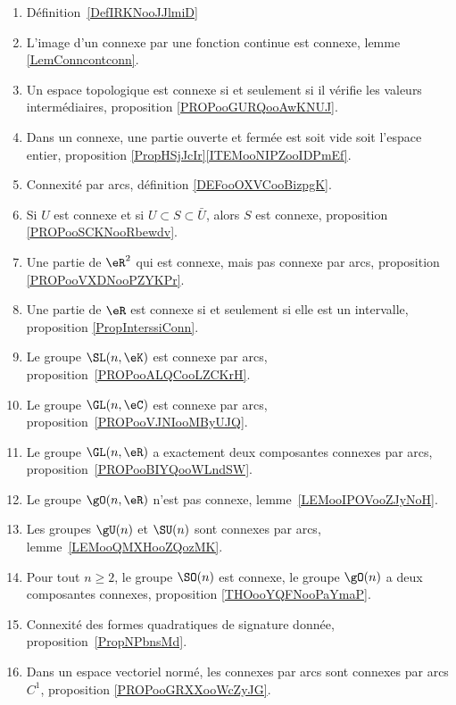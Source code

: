 	\label{THEMEooConnexite}
\begin{enumerate}
	\item
	      Définition~\ref{DefIRKNooJJlmiD}
	\item
	      L'image d'un connexe par une fonction continue est connexe, lemme \ref{LemConncontconn}.
	\item
	      Un espace topologique est connexe si et seulement si il vérifie les valeurs intermédiaires, proposition \ref{PROPooGURQooAwKNUJ}.
	\item
	      Dans un connexe, une partie ouverte et fermée est soit vide soit l'espace entier, proposition \ref{PropHSjJcIr}\ref{ITEMooNIPZooIDPmEf}.
	\item
	      Connexité par arcs, définition \ref{DEFooOXVCooBizpgK}.
	\item
	      Si \( U\) est connexe et si \( U\subset S\subset \bar U\), alors \( S\) est connexe, proposition \ref{PROPooSCKNooRbewdv}.
	\item
	      Une partie de \( \eR^2\) qui est connexe, mais pas connexe par arcs, proposition \ref{PROPooVXDNooPZYKPr}.
	\item
	      Une partie de \( \eR\) est connexe si et seulement si elle est un intervalle, proposition \ref{PropInterssiConn}.
	\item
	      Le groupe \( \SL(n,\eK)\) est connexe par arcs, proposition~\ref{PROPooALQCooLZCKrH}.
	\item
	      Le groupe \( \GL(n,\eC)\) est connexe par arcs, proposition~\ref{PROPooVJNIooMByUJQ}.
	\item
	      Le groupe \( \GL(n,\eR)\) a exactement deux composantes connexes par arcs, proposition~\ref{PROPooBIYQooWLndSW}.
	\item
	      Le groupe \( \gO(n,\eR)\) n'est pas connexe, lemme~\ref{LEMooIPOVooZJyNoH}.
	\item
	      Les groupes \( \gU(n)\) et \( \SU(n)\) sont connexes par arcs, lemme~\ref{LEMooQMXHooZQozMK}.
	\item
	      Pour tout \( n\geq 2\), le groupe \( \SO(n)\) est connexe, le groupe \( \gO(n)\) a deux composantes connexes, proposition \ref{THOooYQFNooPaYmaP}.
	\item
	      Connexité des formes quadratiques de signature donnée, proposition~\ref{PropNPbnsMd}.
	\item
	      Dans un espace vectoriel normé, les connexes par arcs sont connexes par arcs \( C^1\), proposition \ref{PROPooGRXXooWcZyJG}.
\end{enumerate}
